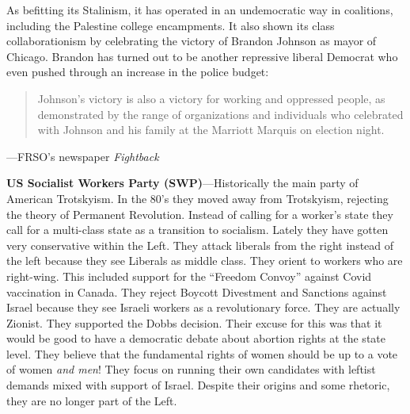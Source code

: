 As befitting its Stalinism, it has operated in an undemocratic way in coalitions, including the Palestine college encampments. It also shown its class collaborationism by celebrating the victory of Brandon Johnson as mayor of Chicago. Brandon has turned out to be another repressive liberal Democrat who even pushed through an increase in the police budget:

\blockquote{Johnson's victory is also a victory for working and oppressed people, as demonstrated by the range of organizations and individuals who celebrated with Johnson and his family at the Marriott Marquis on election night.}

---FRSO's newspaper \emph{Fightback}

\textbf{US Socialist Workers Party (SWP)}---Historically the main party of American Trotskyism. In the 80's they moved away from Trotskyism, rejecting the theory of Permanent Revolution. Instead of calling for a worker's state they call for a multi-class state as a transition to socialism. Lately they have gotten very conservative within the Left. They attack liberals from the right instead of the left because they see Liberals as middle class. They orient to workers who are right-wing. This included support for the ``Freedom Convoy'' against Covid vaccination in Canada. They reject Boycott Divestment and Sanctions against Israel because they see Israeli workers as a revolutionary force. They are actually Zionist. They supported the Dobbs decision. Their excuse for this was that it would be good to have a democratic debate about abortion rights at the state level. They believe that the fundamental rights of women should be up to a vote of women \emph{and men}! They focus on running their own candidates with leftist demands mixed with support of Israel. Despite their origins and some rhetoric, they are no longer part of the Left.

